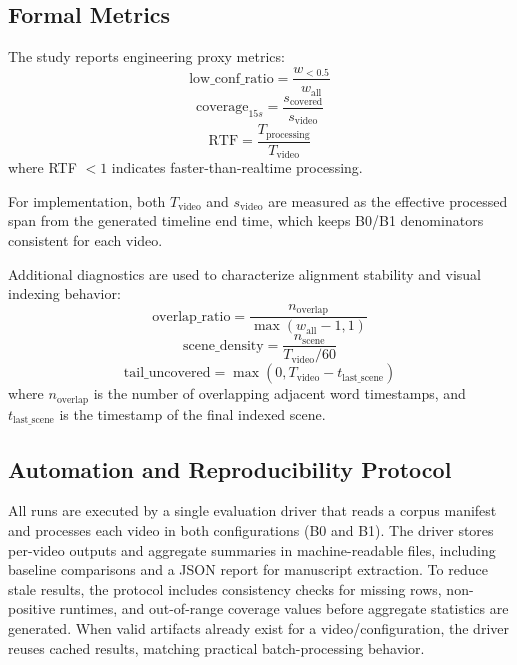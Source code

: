\documentclass[conference]{IEEEtran}
\begin{document}
\subsection{Formal Metrics}
The study reports engineering proxy metrics:
\begin{equation}
\text{low\_conf\_ratio} = \frac{w_{<0.5}}{w_{\text{all}}}
\end{equation}
\begin{equation}
\text{coverage}_{15s} = \frac{s_{\text{covered}}}{s_{\text{video}}}
\end{equation}
\begin{equation}
\text{RTF} = \frac{T_{\text{processing}}}{T_{\text{video}}}
\end{equation}
where RTF $< 1$ indicates faster-than-realtime processing.

For implementation, both $T_{\text{video}}$ and $s_{\text{video}}$ are measured as the effective processed span from the generated timeline end time, which keeps B0/B1 denominators consistent for each video.

Additional diagnostics are used to characterize alignment stability and visual indexing behavior:
\begin{equation}
\text{overlap\_ratio} = \frac{n_{\text{overlap}}}{\max(w_{\text{all}}-1,1)}
\end{equation}
\begin{equation}
\text{scene\_density} = \frac{n_{\text{scene}}}{T_{\text{video}}/60}
\end{equation}
\begin{equation}
\text{tail\_uncovered} = \max(0, T_{\text{video}} - t_{\text{last\_scene}})
\end{equation}
where $n_{\text{overlap}}$ is the number of overlapping adjacent word timestamps, and $t_{\text{last\_scene}}$ is the timestamp of the final indexed scene.

\subsection{Automation and Reproducibility Protocol}
All runs are executed by a single evaluation driver that reads a corpus manifest and processes each video in both configurations (B0 and B1). The driver stores per-video outputs and aggregate summaries in machine-readable files, including baseline comparisons and a JSON report for manuscript extraction. To reduce stale results, the protocol includes consistency checks for missing rows, non-positive runtimes, and out-of-range coverage values before aggregate statistics are generated. When valid artifacts already exist for a video/configuration, the driver reuses cached results, matching practical batch-processing behavior.
\end{document}
